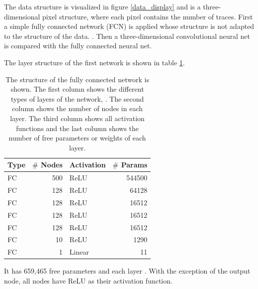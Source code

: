\documentclass[12pt, a4paper]{thesis}
\begin{document}
The data structure is visualized in figure \ref{data_display} and is a
three-dimensional pixel structure, where each pixel contains the
number of traces. First a simple fully connected network (FCN) is
applied whose structure is not adapted to the structure of the
data. . Then a three-dimensional
convolutional neural net is compared with the fully connected neural
net.


The layer structure of the first network is shown in table \ref{fcn_structure}.

\begin{table}[htbp]
  \centering
  \begin{tabular}{lrlr}
    Type & \(\#\) Nodes & Activation & \(\#\) Params\\
    \hline
    FC & 500 & ReLU & 544500\\
    FC & 128 & ReLU & 64128\\
    FC & 128 & ReLU & 16512\\
    FC & 128 & ReLU & 16512\\
    FC & 128 & ReLU & 16512\\
    FC & 10 & ReLU & 1290\\
    FC & 1 & Linear & 11\\
  \end{tabular}
  \caption{The structure of the fully connected network is shown. The
    first column shows the different types of layers of the network,
    . The second column shows the number of nodes in each
    layer. The third column shows all activation functions and the
    last column shows the number of free parameters or weights of each
    layer.}
  \label{fcn_structure}
\end{table}


It has 659,465 free parameters and each layer . With the exception of the output node, all nodes
have ReLU as their activation function.
\end{document}
